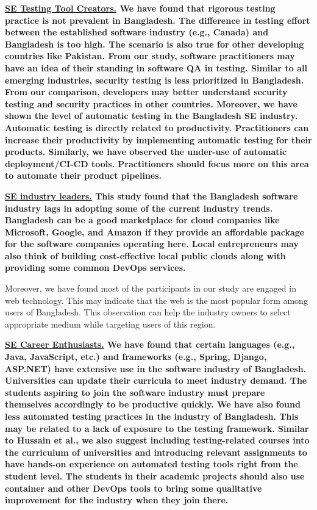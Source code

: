 \bf{\ul{SE Testing Tool Creators.}} We have found that rigorous testing practice is not prevalent in Bangladesh. The difference in testing effort between the established software industry (e.g., Canada) and Bangladesh is too high. The scenario is also true for other developing countries like Pakistan. From our study, software practitioners may have an idea of their standing in software QA in testing. Similar to all emerging industries, security testing is less prioritized in Bangladesh. From our comparison, developers may better understand security testing and security practices in other countries. Moreover, we have shown the level of automatic testing in the Bangladesh SE industry. Automatic testing is directly related to productivity. Practitioners can increase their productivity by implementing automatic testing for their products. Similarly, we have observed the under-use of automatic deployment/CI-CD tools. Practitioners should focus more on this area to automate their product pipelines.
 

\bf{\ul{SE industry leaders.}} This study found that the Bangladesh software industry lags in adopting some of the current industry trends. Bangladesh can be a good marketplace for cloud companies like Microsoft, Google, and Amazon if they provide an affordable package for the software companies operating here. Local entrepreneurs may also think of building cost-effective local public clouds along with providing some common DevOps services.  

Moreover, we have found most of the participants in our study are engaged in web technology. This may indicate that the web is the most popular form among users of Bangladesh. This observation can help the industry owners to select appropriate medium while targeting users of this region. %

\bf{\ul{SE Career Enthusiasts.}} We have found that certain languages (e.g., Java, JavaScript, etc.) and frameworks (e.g., Spring, Django, ASP.NET) have extensive use in the software industry of Bangladesh. Universities can update their curricula to meet industry demand. The students aspiring to join the software industry must prepare themselves accordingly to be productive quickly. We have also found less automated testing practices in the industry of Bangladesh. This may be related to a lack of exposure to the testing framework. Similar to Hussain et al.\citep{Hussain2020}, we also suggest including testing-related courses into the curriculum of universities and introducing relevant assignments to have hands-on experience on automated testing tools right from the student level. The students in their academic projects should also use container and other DevOps tools to bring some qualitative improvement for the industry when they join there.

